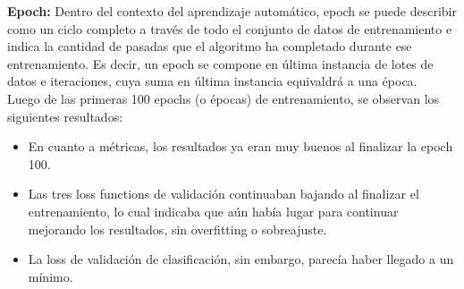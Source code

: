 \textbf{Epoch:} Dentro del contexto del aprendizaje automático, epoch se puede describir como un ciclo completo a través de todo el conjunto de datos de entrenamiento e indica la cantidad de pasadas que el algoritmo ha completado durante ese entrenamiento. Es decir, un epoch se compone en última instancia de lotes de datos e iteraciones, cuya suma en última instancia equivaldrá a una época.
\\
Luego de las primeras 100 epochs (o épocas) de entrenamiento, se observan los siguientes resultados:
\begin{itemize}
    \item En cuanto a métricas, los resultados ya eran muy buenos al finalizar la epoch 100.
    \item Las tres loss functions de validación continuaban bajando al finalizar el entrenamiento, lo cual indicaba que aún había lugar para continuar mejorando los resultados, sin overfitting o sobreajuste.
    \item La loss de validación de clasificación, sin embargo, parecía haber llegado a un mínimo.
\end{itemize}

